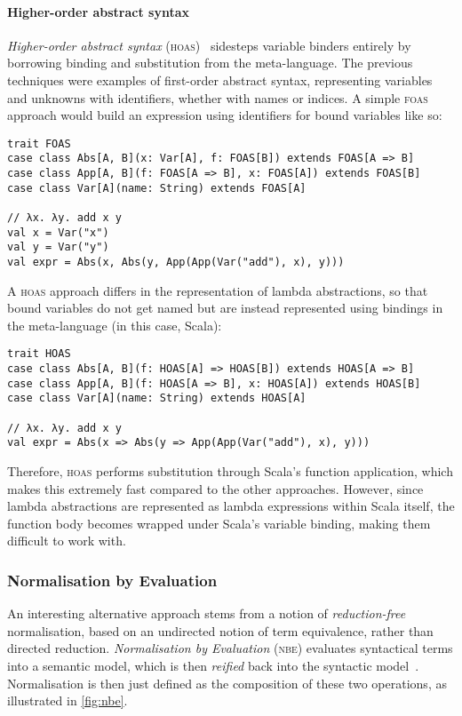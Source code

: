 \documentclass[../../main.tex]{subfiles}
\begin{document}
\paragraph{Higher-order abstract syntax}
\emph{Higher-order abstract syntax} (\textsc{hoas})~\cite{pfenning_hoas_1988} sidesteps variable binders entirely by borrowing binding and substitution from the meta-language.
The previous techniques were examples of first-order abstract syntax, representing variables and unknowns with identifiers, whether with names or indices.
A simple \textsc{foas} approach would build an expression using identifiers for bound variables like so:
\begin{verbatim}
trait FOAS
case class Abs[A, B](x: Var[A], f: FOAS[B]) extends FOAS[A => B]
case class App[A, B](f: FOAS[A => B], x: FOAS[A]) extends FOAS[B]
case class Var[A](name: String) extends FOAS[A]

// λx. λy. add x y
val x = Var("x")
val y = Var("y")
val expr = Abs(x, Abs(y, App(App(Var("add"), x), y)))
\end{verbatim}
%
A \textsc{hoas} approach differs in the representation of lambda abstractions, so that bound variables do not get named but are instead represented using bindings in the meta-language (in this case, Scala):
\begin{verbatim}
trait HOAS
case class Abs[A, B](f: HOAS[A] => HOAS[B]) extends HOAS[A => B]
case class App[A, B](f: HOAS[A => B], x: HOAS[A]) extends HOAS[B]
case class Var[A](name: String) extends HOAS[A]

// λx. λy. add x y
val expr = Abs(x => Abs(y => App(App(Var("add"), x), y)))
\end{verbatim}
%
Therefore, \textsc{hoas} performs substitution through Scala's function application, which makes this extremely fast compared to the other approaches.
However, since lambda abstractions are represented as lambda expressions within Scala itself, the function body becomes wrapped under Scala's variable binding, making them difficult to work with.


\subsubsection{Normalisation by Evaluation}
An interesting alternative approach stems from a notion of \emph{reduction-free} normalisation, based on an undirected notion of term equivalence, rather than directed reduction.
\emph{Normalisation by Evaluation} (\textsc{nbe}) evaluates syntactical terms into a semantic model, which is then \emph{reified} back into the syntactic model~\cite{filinski_nbe_2004}.
Normalisation is then just defined as the composition of these two operations, as illustrated in \cref{fig:nbe}.
\end{document}
